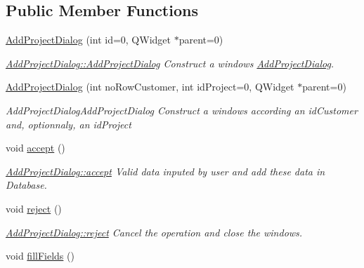 \subsection*{Public Member Functions}
\begin{DoxyCompactItemize}
\item 
\hyperlink{classGui_1_1Dialogs_1_1AddProjectDialog_a1fa86f5366f321233655aaf6923ec892}{Add\-Project\-Dialog} (int id=0, Q\-Widget $\ast$parent=0)
\begin{DoxyCompactList}\small\item\em \hyperlink{classGui_1_1Dialogs_1_1AddProjectDialog_a1fa86f5366f321233655aaf6923ec892}{Add\-Project\-Dialog\-::\-Add\-Project\-Dialog} Construct a windows \hyperlink{classGui_1_1Dialogs_1_1AddProjectDialog}{Add\-Project\-Dialog}. \end{DoxyCompactList}\item 
\hyperlink{classGui_1_1Dialogs_1_1AddProjectDialog_a7433c07961921a18abb56a6aeb741b1f}{Add\-Project\-Dialog} (int no\-Row\-Customer, int id\-Project=0, Q\-Widget $\ast$parent=0)
\begin{DoxyCompactList}\small\item\em Add\-Project\-Dialog\-Add\-Project\-Dialog Construct a windows according an {\itshape id\-Customer} and, optionnaly, an {\itshape id\-Project} \end{DoxyCompactList}\item 
\hypertarget{classGui_1_1Dialogs_1_1AddProjectDialog_abe345ededea4911846a44b984cc04f18}{void \hyperlink{classGui_1_1Dialogs_1_1AddProjectDialog_abe345ededea4911846a44b984cc04f18}{accept} ()}\label{classGui_1_1Dialogs_1_1AddProjectDialog_abe345ededea4911846a44b984cc04f18}

\begin{DoxyCompactList}\small\item\em \hyperlink{classGui_1_1Dialogs_1_1AddProjectDialog_abe345ededea4911846a44b984cc04f18}{Add\-Project\-Dialog\-::accept} Valid data inputed by user and add these data in Database. \end{DoxyCompactList}\item 
\hypertarget{classGui_1_1Dialogs_1_1AddProjectDialog_a767dcea1ae96d2efc3085f8ade4406ce}{void \hyperlink{classGui_1_1Dialogs_1_1AddProjectDialog_a767dcea1ae96d2efc3085f8ade4406ce}{reject} ()}\label{classGui_1_1Dialogs_1_1AddProjectDialog_a767dcea1ae96d2efc3085f8ade4406ce}

\begin{DoxyCompactList}\small\item\em \hyperlink{classGui_1_1Dialogs_1_1AddProjectDialog_a767dcea1ae96d2efc3085f8ade4406ce}{Add\-Project\-Dialog\-::reject} Cancel the operation and close the windows. \end{DoxyCompactList}\item 
\hypertarget{classGui_1_1Dialogs_1_1AddProjectDialog_af31b6ed23acdd5fb8b71caaeddce34f4}{void \hyperlink{classGui_1_1Dialogs_1_1AddProjectDialog_af31b6ed23acdd5fb8b71caaeddce34f4}{fill\-Fields} ()}\label{classGui_1_1Dialogs_1_1AddProjectDialog_af31b6ed23acdd5fb8b71caaeddce34f4}


\end{DoxyCompactItemize}
